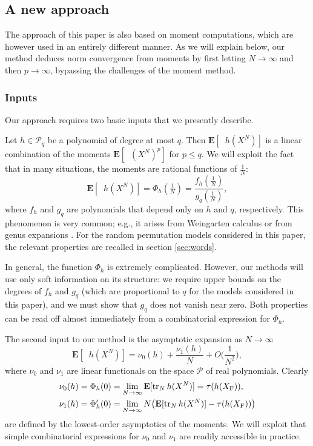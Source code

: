 \documentclass[10pt,reqno]{amsart}
\theoremstyle{definition}
\theoremstyle{remark}
\numberwithin{equation}{section}
\numberwithin{figure}{section}
\numberwithin{table}{section}
\newcommand{\ntrN}{\mathop{\mathrm{tr}_N}}
\newcommand{\EE}{\mathbf{E}}
\begin{document}
\subsection{A new approach}
\label{sec:newappr}

The approach of this paper is also based on moment computations, which are 
however used in an entirely different manner. As we will explain below, 
our method deduces norm convergence from moments by first letting 
$N\to\infty$ and then $p\to\infty$, bypassing the challenges of the moment 
method.

\subsubsection*{\bf Inputs}

Our approach requires two basic inputs that we presently describe.

Let $h\in\mathcal{P}_q$ be a polynomial of degree at most $q$. 
Then $\EE[\ntrN h(X^N)]$ is a linear combination of the moments 
$\EE[\ntrN (X^N)^p]$ for $p\le q$. 
We will exploit the fact that in many situations, the moments
are rational functions of $\frac{1}{N}$:
\begin{equation}
\label{eq:introrational}
	\EE[\ntrN h(X^N)] = \Phi_h(\tfrac{1}{N}) =
	\frac{f_h(\frac{1}{N})}{g_q(\frac{1}{N})},
\end{equation}
where $f_h$ and $g_q$ are polynomials that depend only on $h$ and $q$, 
respectively. This phenomenon is very common; e.g., it arises
from Weingarten calculus \cite{Col22,Col23} or from genus 
expansions \cite[Chapter 1]{MS17}. For the random permutation models
considered in this paper, the relevant properties are recalled
in section \ref{sec:words}.

In general, the function $\Phi_h$ is extremely complicated. However, our 
methods will use only soft information on its structure: we require upper 
bounds on the degrees of $f_h$ and $g_q$ (which are 
proportional to $q$ for the models considered in this paper), and we must 
show that $g_q$ does not vanish near zero. Both properties can be read off 
almost immediately from a combinatorial expression for $\Phi_h$.

The second input to our method is the asymptotic expansion 
as $N\to\infty$
\begin{equation}
\label{eq:introanalytic}
	\EE[\ntrN h(X^N)] = 
	\nu_0(h) + \frac{\nu_1(h)}{N} + O\bigg(\frac{1}{N^2}\bigg),
\end{equation}
where $\nu_0$ and $\nu_1$ are linear functionals on the space
$\mathcal{P}$ of real polynomials. Clearly
\begin{align*}
	\nu_0(h) &= \Phi_h(0) = \lim_{N\to\infty} \EE[\ntrN h(X^N)] =
	\tau(h(X_{\rm F})),\\
	\nu_1(h) &= \Phi_h'(0) = \lim_{N\to\infty} N\big(
	\EE[\ntrN h(X^N)]- \tau(h(X_{\rm F}))\big)
\end{align*}
are defined by the lowest-order asymptotics of the moments.
We will exploit that
simple combinatorial expressions for $\nu_0$ and $\nu_1$ are readily 
accessible in practice.
\end{document}
